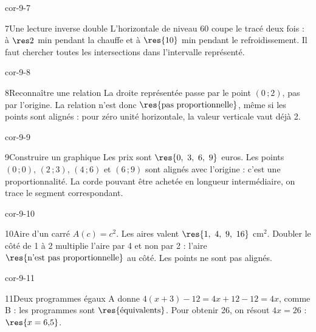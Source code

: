 \begin{blocLivre}{cor-9-7}\begin{corrige}{7}{Une lecture inverse double}
L’horizontale de niveau 60 coupe le tracé deux fois : à $\res2$ min pendant la chauffe et à $\res{10}$ min pendant le refroidissement. Il faut chercher toutes les intersections dans l’intervalle représenté.
\label{fig-cor-9-7}
\end{corrige}\end{blocLivre}
\begin{blocLivre}{cor-9-8}\begin{corrige}{8}{Reconnaître une relation}
La droite représentée passe par le point $(0\,;2)$, pas par l’origine. La relation n’est donc $\res{\text{pas proportionnelle}}$, même si les points sont alignés : pour zéro unité horizontale, la valeur verticale vaut déjà 2.
\label{fig-cor-9-8}
\end{corrige}\end{blocLivre}
\begin{blocLivre}{cor-9-9}\begin{corrige}{9}{Construire un graphique}
Les prix sont $\res{0,\ 3,\ 6,\ 9}$ euros. Les points $(0\,;0)$, $(2\,;3)$, $(4\,;6)$ et $(6\,;9)$ sont alignés avec l’origine : c’est une proportionnalité. La corde pouvant être achetée en longueur intermédiaire, on trace le segment correspondant.
\label{fig-cor-9-9}
\end{corrige}\end{blocLivre}
\begin{blocLivre}{cor-9-10}\begin{corrige}{10}{Aire d’un carré}
$A(c)=c^2$. Les aires valent $\res{1,\ 4,\ 9,\ 16}$ cm$^2$. Doubler le côté de 1 à 2 multiplie l’aire par 4 et non par 2 : l’aire $\res{\text{n’est pas proportionnelle}}$ au côté. Les points ne sont pas alignés.
\label{fig-cor-9-10}
\end{corrige}\end{blocLivre}
\begin{blocLivre}{cor-9-11}\begin{corrige}{11}{Deux programmes égaux}
A donne $4(x+3)-12=4x+12-12=4x$, comme B : les programmes sont $\res{\text{équivalents}}$. Pour obtenir 26, on résout $4x=26$ : $\res{x=6{,}5}$.
\end{corrige}\end{blocLivre}
